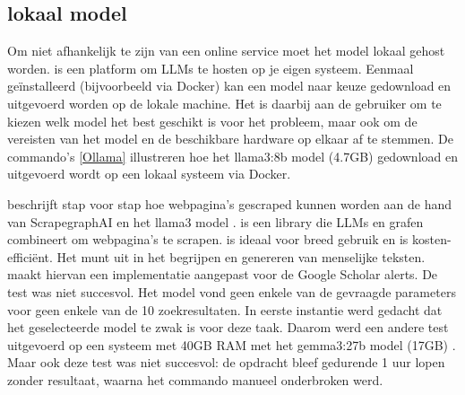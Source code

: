 \subsection{lokaal model}
Om niet afhankelijk te zijn van een online service moet het model lokaal gehost worden. \textcite{Ollama2025} is een platform om LLMs te hosten op je eigen systeem. Eenmaal geïnstalleerd (bijvoorbeeld via Docker) kan een model naar keuze gedownload en uitgevoerd worden op de lokale machine.
Het is daarbij aan de gebruiker om te kiezen welk model het best geschikt is voor het probleem, maar ook om de vereisten van het model en de beschikbare hardware op elkaar af te stemmen. De commando's \ref{Ollama} illustreren hoe het llama3:8b model (4.7GB) gedownload en uitgevoerd wordt op een lokaal systeem via Docker.
\begin{listing}
    docker exec -it ollama ollama pull llama3:8b
    docker exec -it ollama ollama run llama3
    \caption[Ollama]Ollama}
    \label{Ollama}
\end{listing}
\textcite{Scrapegraphaillama2025} beschrijft stap voor stap hoe webpagina's gescraped kunnen worden aan de hand van ScrapegraphAI en het llama3 model \autocite{Anthropicmodel2025}.
\textcite{ScrapeGraphAI2025} is een library die LLMs en grafen combineert om webpagina's te scrapen. \textcite{LLama32025} is ideaal voor breed gebruik en is kosten-efficiënt. Het munt uit in het begrijpen en genereren van menselijke teksten.
\textcite{Depaepeollama2025} maakt hiervan een implementatie aangepast voor de Google Scholar alerts.
De test was niet succesvol. Het model vond geen enkele van de gevraagde parameters voor geen enkele van de 10 zoekresultaten.
In eerste instantie werd gedacht dat het geselecteerde model te zwak is voor deze taak. Daarom werd een andere test uitgevoerd op een systeem met 40GB RAM met het gemma3:27b model (17GB) \autocite{Gemma32025}. Maar ook deze test was niet succesvol: de opdracht bleef gedurende 1 uur lopen zonder resultaat, waarna het commando manueel onderbroken werd. 
